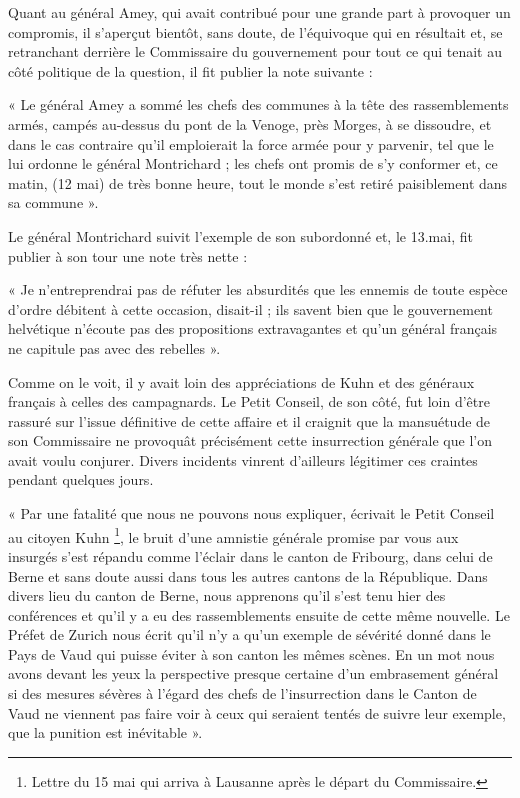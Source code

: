 \documentclass[french,twoside]{book} %
\newenvironment{quoteblock}%
  {\begin{quoting}}
  {\end{quoting}}
\newenvironment{quotebar}{%
    \def\FrameCommand{{\color{rubric!10!}\vrule width 0.5em} \hspace{0.9em}}%
    \def\OuterFrameSep{\itemsep} %
    \MakeFramed {\advance\hsize-\width \FrameRestore}
  }%
  {%
    \endMakeFramed
  }
\renewenvironment{quoteblock}%
  {%
    \savenotes
    \setstretch{0.9}
    \begin{quotebar}
  }
  {%
    \end{quotebar}
    \spewnotes
  }
\begin{document}
\noindent Quant au général Amey, qui avait contribué pour une grande part à provoquer un compromis, il s’aperçut bientôt, sans doute, de l’équivoque qui en résultait et, se retranchant derrière le Commissaire du gouvernement pour tout ce qui tenait au côté politique de la question, il fit publier la note suivante :\par

\begin{quoteblock}
 \noindent « Le général Amey a sommé les chefs des communes à la tête des rassemblements armés, campés au-dessus du pont de la Venoge, près Morges, à se dissoudre, et dans le cas contraire qu’il emploierait la force armée pour y parvenir, tel que le lui ordonne le général Montrichard ; les chefs ont promis de s’y conformer et, ce matin, (12 mai) de très bonne heure, tout le monde s’est retiré paisiblement dans sa commune ».
 \end{quoteblock}

\noindent Le général Montrichard suivit l’exemple de son subordonné et, le 13.mai, fit publier à son tour une note très nette :\par

\begin{quoteblock}
 \noindent « Je n’entreprendrai pas de réfuter les absurdités que les ennemis de toute espèce d’ordre débitent à cette occasion, disait-il ; ils savent bien que le gouvernement helvétique n’écoute pas des propositions extravagantes et qu’un général français ne capitule pas avec des rebelles ».
 \end{quoteblock}

\noindent Comme on le voit, il y avait loin des appréciations de Kuhn et des généraux français à celles des campagnards. Le Petit Conseil, de son côté, fut loin d’être rassuré sur l’issue définitive de cette affaire et il craignit que la mansuétude de son Commissaire ne provoquât précisément cette insurrection générale que l’on avait voulu conjurer. Divers incidents vinrent d’ailleurs légitimer ces craintes pendant quelques jours.\par

\begin{quoteblock}
 \noindent « Par une fatalité que nous ne pouvons nous expliquer, écrivait le Petit Conseil au citoyen Kuhn \footnote{Lettre du 15 mai qui arriva à Lausanne après le départ du Commissaire.}, le bruit d’une amnistie générale promise par vous aux insurgés s’est répandu comme l’éclair dans le canton de Fribourg, dans celui de Berne et sans doute aussi dans tous les autres cantons de la République. Dans divers lieu du canton de Berne, nous apprenons qu’il s’est tenu hier des conférences et qu’il y a eu des rassemblements ensuite de cette même nouvelle. Le Préfet de Zurich nous écrit qu’il n’y a qu’un exemple de sévérité donné dans le Pays de Vaud qui puisse éviter à son canton les mêmes scènes. En un mot nous avons devant les yeux la perspective presque certaine d’un embrasement général si des mesures sévères à l’égard des chefs de l’insurrection dans le Canton de Vaud ne viennent pas faire voir à ceux qui seraient tentés de suivre leur exemple, que la punition est inévitable ».
 \end{quoteblock}
\end{document}
